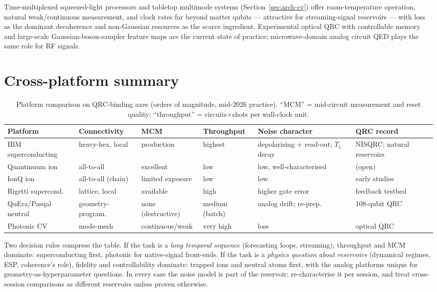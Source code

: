 Time-multiplexed squeezed-light processors \citep{madsen2022quantum} and
tabletop multimode systems (Section~\ref{sec:arch-cv}) offer
room-temperature operation, natural weak/continuous measurement, and clock
rates far beyond matter qubits --- attractive for streaming-signal reservoirs
--- with loss as the dominant decoherence and non-Gaussian resources as the
scarce ingredient. Experimental optical QRC with controllable memory
\citep{paparelle2025experimental,garciabeni2023scalable} and large-scale
Gaussian-boson-sampler feature maps \citep{cimini2025gaussian} are the
current state of practice; microwave-domain analog circuit QED
\citep{senanian2024microwave,dudas2023quantum} plays the same role for RF
signals.

\section{Cross-platform summary}

\begin{table}[h]
\centering\small
\caption{Platform comparison on QRC-binding axes (orders of magnitude,
mid-2026 practice). ``MCM'' = mid-circuit measurement and reset quality;
``throughput'' = circuits$\times$shots per wall-clock unit.}
\label{tab:hw-compare}
\begin{tabular}{@{}p{2.9cm}p{2.2cm}p{2.0cm}p{2.0cm}p{2.2cm}p{2.6cm}@{}}
\toprule
Platform & Connectivity & MCM & Throughput & Noise character & QRC record \\
\midrule
IBM superconducting & heavy-hex, local & production & highest & depolarising $+$ read-out; $T_1$ decay & NISQRC; natural reservoirs \citep{hu2024overcoming,suzuki2022natural,yasuda2023quantum} \\
Quantinuum ion & all-to-all & excellent & low & low, well-characterised & (open) \\
IonQ ion & all-to-all (chain) & limited exposure & low & low & early studies \\
Rigetti supercond. & lattice, local & available & high & higher gate error & feedback testbed \\
QuEra/Pasqal neutral & geometry-program. & none (destructive) & medium (batch) & analog drift; re-prep. & 108-qubit QRC \citep{kornjaca2024large} \\
Photonic CV & mode-mesh & continuous/weak & very high & loss & optical QRC \citep{paparelle2025experimental,cimini2025gaussian} \\
\bottomrule
\end{tabular}
\end{table}

Two decision rules compress the table. If the task is a \emph{long temporal
sequence} (forecasting loops, streaming), throughput and MCM dominate:
superconducting first, photonic for native-signal front-ends. If the task is
a \emph{physics question about reservoirs} (dynamical regimes, ESP,
coherence's role), fidelity and controllability dominate: trapped ions and
neutral atoms first, with the analog platforms unique for
geometry-as-hyperparameter questions. In every case the noise model is part
of the reservoir: re-characterise it per session, and treat cross-session
comparisons as different reservoirs unless proven otherwise.
